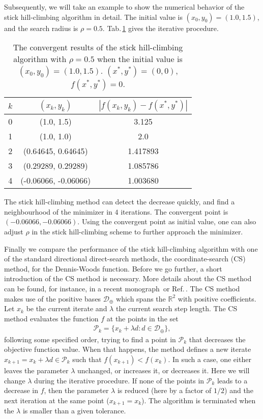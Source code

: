 \documentclass[mathpazo]{aamm}
\newcommand{\bmx}{x}
\begin{document}
Subsequently, we will take an example to show the numerical
behavior of the stick hill-climbing algorithm in detail. The
initial value is $(x_0, y_0)=(1.0, 1.5)$, and the search radius
is $\rho=0.5$. Tab.\,\ref{tab:dw:CHC} gives the iterative procedure.
\begin{table}[!htbp] \caption{\label{tab:dw:CHC}The convergent
	results of the stick hill-climbing algorithm with $\rho=0.5$
	when the initial value is $(x_0, y_0)=(1.0, 1.5)$. $(x^*,
	y^*)=(0,0)$, $f(x^*,y^*)=0$.}
\begin{center}
	\footnotesize{
\begin{tabular}{|c|c|c|}
 \hline
$k$ & $(x_k,y_k)$ & $|f(x_k,y_k)-f(x^*,y^*)|$ 
 \\ \hline
0 & (1.0, 1.5) & 3.125
 \\ \hline
1 &	(1.0, 1.0) & 2.0
 \\ \hline
2 & (0.64645, 0.64645)  & 1.417893
 \\ \hline
3 & (0.29289, 0.29289) &  1.085786
 \\ \hline
4 & (-0.06066, -0.06066) & 1.003680
 \\ \hline
\end{tabular}
}
\end{center}
\end{table}
The stick hill-climbing method can detect the decrease
quickly, and find a neighbourhood of the minimizer in
$4$ iterations. The convergent point is $(-0.06066,-0.06066)$. 
Using the convergent point as initial value, one can also adjust
$\rho$ in the stick hill-climbing scheme to further approach the minimizer. 	

Finally we compare the performance of the stick hill-climbing algorithm with one
of the standard directional direct-search methods, the
coordinate-search (CS) method, for the Dennis-Woods function.
Before we go further, a short introduction of the CS method is necessary. 
More details about the CS method can be found, for instance, 
in a recent monograph\,\cite{conn2009introduction} or
Ref.\,\cite{kolda2003optimization}. 
The CS method makes use of the positive bases
$\mathcal{D}_{\oplus}$ which spans the $\mathbb{R}^2$ with
positive coefficients. Let $\bmx_k$ be the current iterate and
$\lambda$ the current search step length. The CS method evaluates
the function $f$ at the points in the set
\begin{align*}
	\mathcal{P}_k = \{\bmx_k + \lambda d:
	d\in\mathcal{D}_{\oplus}\},
\end{align*}
following some specified order, trying to find a point in
$\mathcal{P}_k$ that decreases the objective function value. 
When that happens, the method defines a new iterate
$\bmx_{k+1}=\bmx_{k}+\lambda d \in \mathcal{P}_k$ such that
$f(\bmx_{k+1})<f(\bmx_{k})$. In such a case, one either leaves
the parameter $\lambda$ unchanged, or increases it, or decreases it. 
Here we will change $\lambda$ during the iterative procedure.
If none of the points in
$\mathcal{P}_k$ leads to a decrease in $f$, then the parameter
$\lambda$ is reduced (here by a factor of $1/2$) and the next
iteration at the same point ($\bmx_{k+1}=\bmx_{k}$). The
algorithm is terminated when the $\lambda$ is smaller than a
given tolerance. 
\end{document}
